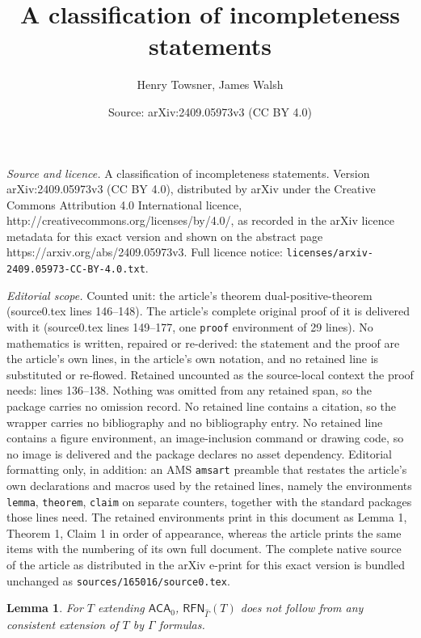 \documentclass[10pt,a4paper]{amsart}
\title{A classification of incompleteness statements}
\author{Henry Towsner, James Walsh}
\date{Source: arXiv:2409.05973v3 (CC BY 4.0)}
\newtheorem{lemma}{Lemma}
\begin{document}
\maketitle

\noindent\emph{Source and licence.} A classification of incompleteness statements. Version arXiv:2409.05973v3 (CC BY 4.0), distributed by arXiv under the Creative Commons Attribution 4.0 International licence, http://creativecommons.org/licenses/by/4.0/, as recorded in the arXiv licence metadata for this exact version and shown on the abstract page https://arxiv.org/abs/2409.05973v3. Full licence notice: \texttt{licenses/arxiv-2409.05973-CC-BY-4.0.txt}.\par\smallskip

\noindent\textit{Editorial scope.} Counted unit: the article's theorem dual-positive-theorem (source0.tex lines 146--148). The article's complete original proof of it is delivered with it (source0.tex lines 149--177, one \texttt{proof} environment of 29 lines). No mathematics is written, repaired or re-derived: the statement and the proof are the article's own lines, in the article's own notation, and no retained line is substituted or re-flowed.  Retained uncounted as the source-local context the proof needs: lines 136--138.  Nothing was omitted from any retained span, so the package carries no omission record.  No retained line contains a citation, so the wrapper carries no bibliography and no bibliography entry.  No retained line contains a figure environment, an image-inclusion command or drawing code, so no image is delivered and the package declares no asset dependency.  Editorial formatting only, in addition: an AMS \texttt{amsart} preamble that restates the article's own declarations and macros used by the retained lines, namely the environments \texttt{lemma}, \texttt{theorem}, \texttt{claim} on separate counters, together with the standard packages those lines need.  The retained environments print in this document as Lemma 1, Theorem 1, Claim 1 in order of appearance, whereas the article prints the same items with the numbering of its own full document.  The complete native source of the article as distributed in the arXiv e-print for this exact version is bundled unchanged as \texttt{sources/165016/source0.tex}.
\begin{lemma}\label{reflection}
For $T$ extending $\mathsf{ACA}_0$, $\mathsf{RFN}_{\widehat\Gamma}(T)$ does not follow from any consistent extension of $T$ by $\Gamma$ formulas.
\end{lemma}
\end{document}
